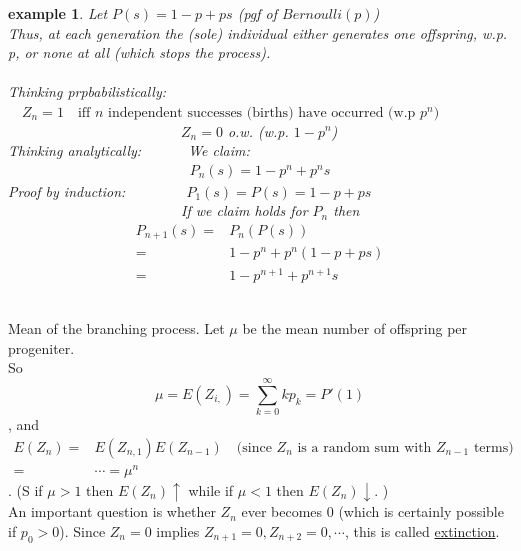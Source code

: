 \documentclass[12pt]{article}
\theoremstyle{definition}
\theoremstyle{plain}
\newtheorem*{example}{example}
\begin{document}
\begin{example}
Let $P(s) = 1-p + ps$ (pgf of $Bernoulli(p)$) \\
Thus, at each generation the (sole) individual either generates one offspring, w.p. p, or none at all (which stops the process). \\
$\mbox{}$\\
Thinking prpbabilistically:  $\quad Z_n = 1  \quad \mbox{iff $n$ independent successes (births) have occurred (w.p $p^n$)}$ \\
				$\mbox{}\qquad\qquad\qquad\qquad\qquad\qquad$ $Z_n = 0$ o.w.  (w.p. $1-p^n$) \\
Thinking analytically: $\quad\qquad$We claim: \begin{displaymath}\begin{aligned}P_n(s) = 1 - p^n + p^ns \end{aligned}\end{displaymath}
Proof by induction:    $\qquad \qquad P_1(s) = P(s) = 1 - p + ps$ \\
			     $\mbox{}  \qquad \qquad \qquad \qquad \qquad \qquad$	If we claim holds for $P_n$ then
			     \begin{displaymath}
			     \begin{aligned}
			     P_{n+1}(s) =& P_n(P(s)) \\
			     		   =& 1 - p^n + p^n(1-p+ps) \\
			     		   =& 1-p^{n+1} + p^{n+1}s
			     \end{aligned}
			     \end{displaymath}
\end{example}
$\mbox{}$\\
Mean of the branching process.
Let $\mu$ be the mean number of offspring per progeniter. \\
So \[\mu = E(Z_{i,}) = \sum_{k=0}^\infty kp_k = P'(1)\], and 
\begin{displaymath}
\begin{aligned}
E(Z_n) =& E(Z_{n,1})E(Z_{n-1}) \quad \mbox{(since $Z_n$ is a random sum with $Z_{n-1}$ terms)} \\
	 = & \cdots = \mu^n
\end{aligned}
\end{displaymath}
. (S if $\mu > 1$ then $E(Z_n) \uparrow$ while if $\mu < 1$ then $E(Z_n) \downarrow$. ) \\
An important question is whether $Z_n$ ever becomes $0$ (which is certainly possible if $p_0 > 0$). Since $Z_n = 0$ implies $Z_{n+1} = 0, Z_{n+2}=0, \cdots$, this is called \underline{extinction}.
\end{document}
